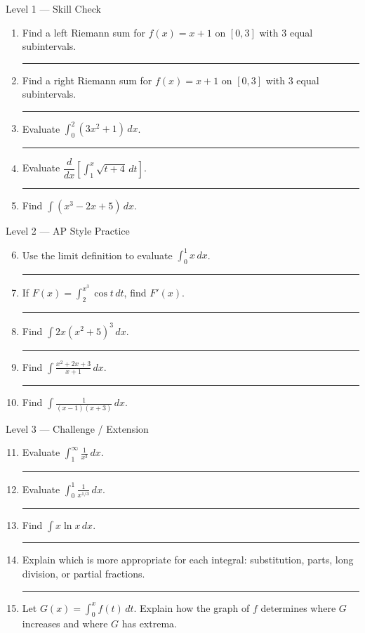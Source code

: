 \documentclass[11pt]{article}
\newcommand{\hwspace}{\vspace{0.8em}\hrule\vspace{0.8em}}
\begin{document}
\begin{homeworkset}{Level 1 --- Skill Check}
\begin{enumerate}
    \item Find a left Riemann sum for \(f(x)=x+1\) on \([0,3]\) with \(3\) equal subintervals.
    \hwspace

    \item Find a right Riemann sum for \(f(x)=x+1\) on \([0,3]\) with \(3\) equal subintervals.
    \hwspace

    \item Evaluate \(\int_0^2 (3x^2+1)\,dx\).
    \hwspace

    \item Evaluate \(\dfrac{d}{dx}\left[\int_1^x \sqrt{t+4}\,dt\right]\).
    \hwspace

    \item Find \(\int (x^3-2x+5)\,dx\).
\end{enumerate}
\end{homeworkset}

\begin{homeworkset}{Level 2 --- AP Style Practice}
\begin{enumerate}
\setcounter{enumi}{5}
    \item Use the limit definition to evaluate \(\int_0^1 x\,dx\).
    \hwspace

    \item If \(F(x)=\int_2^{x^3}\cos t\,dt\), find \(F'(x)\).
    \hwspace

    \item Find \(\int 2x(x^2+5)^3\,dx\).
    \hwspace

    \item Find \(\int \frac{x^2+2x+3}{x+1}\,dx\).
    \hwspace

    \item Find \(\int \frac{1}{(x-1)(x+3)}\,dx\).
\end{enumerate}
\end{homeworkset}

\begin{homeworkset}{Level 3 --- Challenge / Extension}
\begin{enumerate}
\setcounter{enumi}{10}
    \item Evaluate \(\int_1^\infty \frac{1}{x^3}\,dx\).
    \hwspace

    \item Evaluate \(\int_0^1 \frac{1}{x^{1/3}}\,dx\).
    \hwspace

    \item Find \(\int x\ln x\,dx\).
    \hwspace

    \item Explain which is more appropriate for each integral: substitution, parts, long division, or partial fractions.
    \hwspace

    \item Let \(G(x)=\int_0^x f(t)\,dt\). Explain how the graph of \(f\) determines where \(G\) increases and where \(G\) has extrema.
\end{enumerate}
\end{homeworkset}
\end{document}
